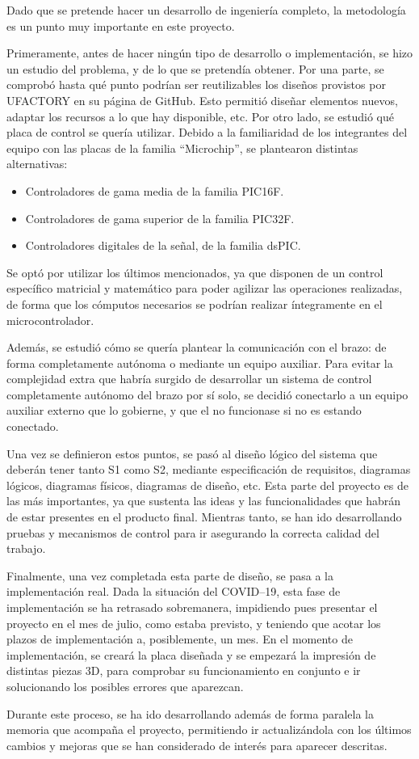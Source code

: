 Dado que se pretende hacer un desarrollo de ingeniería completo, la metodología es un
punto muy importante en este proyecto.

Primeramente, antes de hacer ningún tipo de desarrollo o implementación, se hizo un
estudio del problema, y de lo que se pretendía obtener. Por una parte, se comprobó
hasta qué punto podrían ser reutilizables los diseños provistos por UFACTORY
en su página de GitHub. Esto permitió diseñar elementos nuevos, adaptar los recursos
a lo que hay disponible, etc. 
Por otro lado, se estudió qué placa de control se quería utilizar. Debido a la familiaridad
de los integrantes del equipo con las placas de la familia ``Microchip'', se plantearon
distintas alternativas:

\begin{itemize}
    \item Controladores de gama media de la familia PIC16F.
    \item Controladores de gama superior de la familia PIC32F.
    \item Controladores digitales de la señal, de la familia dsPIC.
\end{itemize}

Se optó por utilizar los últimos mencionados, ya que disponen de un control específico
matricial y matemático para poder agilizar las operaciones realizadas, de forma que
los cómputos necesarios se podrían realizar íntegramente en el microcontrolador.

Además, se estudió cómo se quería plantear la comunicación con el brazo: de forma
completamente autónoma o mediante un equipo auxiliar. Para evitar la complejidad extra
que habría surgido de desarrollar un sistema de control completamente autónomo del brazo
por sí solo, se decidió conectarlo a un equipo auxiliar externo que lo gobierne, y que
el \pArm{} no funcionase si no es estando conectado.

Una vez se definieron estos puntos, se pasó al diseño lógico del sistema que deberán
tener tanto \ac{S1} como \ac{S2}, mediante especificación de requisitos, diagramas lógicos,
diagramas físicos, diagramas de diseño, etc. Esta parte del proyecto es de las más 
importantes, ya que sustenta las ideas y las funcionalidades que habrán de estar presentes
en el producto final. Mientras tanto, se han ido desarrollando pruebas y mecanismos de
control para ir asegurando la correcta calidad del trabajo.

Finalmente, una vez completada esta parte de diseño, se pasa a la implementación real.
Dada la situación del COVID--19, esta fase de implementación se ha retrasado sobremanera,
impidiendo pues presentar el proyecto en el mes de julio, como estaba previsto, y teniendo
que acotar los plazos de implementación a, posiblemente, un mes. En el momento de
implementación, se creará la placa diseñada y se empezará la impresión de distintas piezas
3D, para comprobar su funcionamiento en conjunto e ir solucionando los posibles errores
que aparezcan.

Durante este proceso, se ha ido desarrollando además de forma paralela la memoria que 
acompaña el proyecto, permitiendo ir actualizándola con los últimos cambios y mejoras que
se han considerado de interés para aparecer descritas.